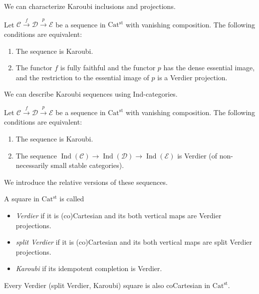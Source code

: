 \documentclass[a4paper,dvipdfmx,11pt,reqno]{amsart}
\DeclareMathOperator{\Ind}{Ind}
\newcommand{\C}{\mathcal{C}}
\newcommand{\D}{\mathcal{D}}
\newcommand{\E}{\mathcal{E}}
\newcommand{\Catst}{\mathrm{Cat^{st}}}
\begin{document}
We can characterize Karoubi inclusions and projections.

\begin{proposition}
  Let $\C \xrightarrow{f} \D \xrightarrow{p} \E$ be a sequence in $\Catst$ with vanishing composition.
  The following conditions are equivalent:
  \begin{enumerate}
    \item The sequence is Karoubi.
    \item The functor $f$ is fully faithful and the functor $p$ has the dense essential image, and the restriction to the essential image of $p$ is a Verdier projection.
  \end{enumerate}
\end{proposition}

We can describe Karoubi sequences using Ind-categories. 

\begin{theorem} %
  Let $\C \xrightarrow{f} \D \xrightarrow{p} \E$ be a sequence in $\Catst$ with vanishing composition.
  The following conditions are equivalent:
  \begin{enumerate}
    \item The sequence is Karoubi.
    \item The sequence $\Ind(\C) \to \Ind(\D) \to \Ind(\E)$ is Verdier (of non-necessarily small stable categories).
  \end{enumerate}
\end{theorem}

We introduce the relative versions of these sequences.

\begin{definition}
  A square in $\Catst$ is called
  \begin{itemize}
    \item \textit{Verdier} if it is (co)Cartesian and its both vertical maps are Verdier projections.
    \item \textit{split Verdier} if it is (co)Cartesian and its both vertical maps are split Verdier projections.
    \item \textit{Karoubi} if its idempotent completion is Verdier.
  \end{itemize}
\end{definition}

\begin{remark}
  Every Verdier (split Verdier, Karoubi) square is also coCartesian in $\Catst$.
\end{remark}
\end{document}
